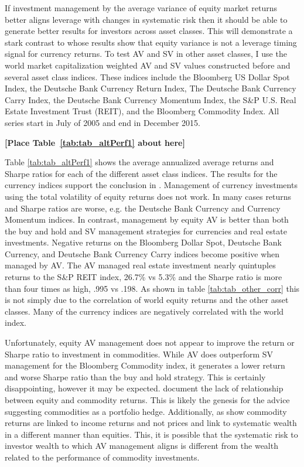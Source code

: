 If investment management by the average variance of equity market returns better aligns leverage with changes in systematic risk then it should be able to generate better results for investors across asset classes. This will demonstrate a stark contrast to \citet{moreira_volatility-managed_2017} whose results show that equity variance is not a leverage timing signal for currency returns. To test AV and SV in other asset classes, I use the world market capitalization weighted AV and SV values constructed before and several asset class indices. These indices include the Bloomberg US Dollar Spot Index, the Deutsche Bank Currency Return Index, The Deutsche Bank Currency Carry Index, the Deutsche Bank Currency Momentum Index, the S\&P U.S. Real Estate Investment Trust (REIT), and the Bloomberg Commodity Index. All series start in July of 2005 and end in December 2015.

\bigskip
\centerline{\bf [Place Table~\ref{tab:tab_altPerf1} about here]}
\bigskip

Table \ref{tab:tab_altPerf1} shows the average annualized average returns and Sharpe ratios for each of the different asset class indices. The results for the currency indices support the conclusion in \citet{moreira_volatility-managed_2017}. Management of currency investments using the total volatility of equity returns does not work. In many cases returns and Sharpe ratios are worse, e.g. the Deutsche Bank Currency and Currency Momentum indices. In contrast, management by equity AV is better than both the buy and hold and SV management strategies for currencies and real estate investments. Negative returns on the Bloomberg Dollar Spot, Deutsche Bank Currency, and Deutsche Bank Currency Carry indices become positive when managed by AV. The AV managed real estate investment nearly quintuples returns to the S\&P REIT index, 26.7\% vs 5.3\% and the Sharpe ratio is more than four times as high, .995 vs .198. As shown in table \ref{tab:tab_other_corr} this is not simply due to the correlation of world equity returns and the other asset classes. Many of the currency indices are negatively correlated with the world index.

Unfortunately, equity AV management does not appear to improve the return or Sharpe ratio to investment in commodities. While AV does outperform SV management for the Bloomberg Commodity index, it generates a lower return and worse Sharpe ratio than the buy and hold strategy. This is certainly disappointing, however it may be expected. \citet{gorton_facts_2006,buyuksahin_commodities_2008,NBERw21243} document the lack of relationship between equity and commodity returns. This is likely the genesis for the advice suggesting commodities as a portfolio hedge. Additionally, as \citet{erb_conquering_nodate} show commodity returns are linked to income returns and not prices and link to systematic wealth in a different manner than equities. This, it is possible that the systematic risk to investor wealth to which AV management aligns is different from the wealth related to the performance of commodity investments.

